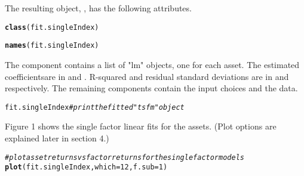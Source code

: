 \documentclass[a4paper]{article}\usepackage[]{graphicx}\usepackage[]{color}
\makeatletter
\newcommand{\hlnum}[1]{\textcolor[rgb]{0.686,0.059,0.569}{#1}}%
\newcommand{\hlcom}[1]{\textcolor[rgb]{0.678,0.584,0.686}{\textit{#1}}}%
\newcommand{\hlstd}[1]{\textcolor[rgb]{0.345,0.345,0.345}{#1}}%
\newcommand{\hlkwc}[1]{\textcolor[rgb]{0.333,0.667,0.333}{#1}}%
\newcommand{\hlkwd}[1]{\textcolor[rgb]{0.737,0.353,0.396}{\textbf{#1}}}%
\newenvironment{kframe}{%
 \def\at@end@of@kframe{}%
 \ifinner\ifhmode%
  \def\at@end@of@kframe{\end{minipage}}%
  \begin{minipage}{\columnwidth}%
 \fi\fi%
 \def\FrameCommand##1{\hskip\@totalleftmargin \hskip-\fboxsep
 \colorbox{shadecolor}{##1}\hskip-\fboxsep
     \hskip-\linewidth \hskip-\@totalleftmargin \hskip\columnwidth}%
 \MakeFramed {\advance\hsize-\width
   \@totalleftmargin\z@ \linewidth\hsize
   \@setminipage}}%
 {\par\unskip\endMakeFramed%
 \at@end@of@kframe}
\newenvironment{knitrout}{}{} %
\makeatother
\begin{document}
The resulting object, , has the following attributes.
\begin{knitrout}
\color{fgcolor}\begin{kframe}
\begin{alltt}
\hlkwd{class}\hlstd{(fit.singleIndex)}
\end{alltt}


{\ttfamily\noindent\bfseries\color{errorcolor}{\#\# Error in eval(expr, envir, enclos): object 'fit.singleIndex' not found}}\begin{alltt}
\hlkwd{names}\hlstd{(fit.singleIndex)}
\end{alltt}


{\ttfamily\noindent\bfseries\color{errorcolor}{\#\# Error in eval(expr, envir, enclos): object 'fit.singleIndex' not found}}\end{kframe}
\end{knitrout}

The component  contains a list of "lm" objects\footnotemark[1], one for each asset. The estimated coefficients\footnotemark[2] are in  and . R-squared and residual standard deviations are in  and  respectively. The remaining components contain the input choices and the data.



\begin{knitrout}
\color{fgcolor}\begin{kframe}
\begin{alltt}
\hlstd{fit.singleIndex} \hlcom{# print the fitted "tsfm" object}
\end{alltt}


{\ttfamily\noindent\bfseries\color{errorcolor}{\#\# Error in eval(expr, envir, enclos): object 'fit.singleIndex' not found}}\end{kframe}
\end{knitrout}

Figure 1 shows the single factor linear fits for the assets. (Plot options are explained later in section 4.)

\begin{knitrout}
\color{fgcolor}\begin{kframe}
\begin{alltt}
\hlcom{# plot asset returns vs factor returns for the single factor models}
\hlkwd{plot}\hlstd{(fit.singleIndex,} \hlkwc{which}\hlstd{=}\hlnum{12}\hlstd{,} \hlkwc{f.sub}\hlstd{=}\hlnum{1}\hlstd{)}
\end{alltt}


{\ttfamily\noindent\bfseries\color{errorcolor}{\#\# Error in plot(fit.singleIndex, which = 12, f.sub = 1): object 'fit.singleIndex' not found}}\end{kframe}
\end{knitrout}
\end{document}
